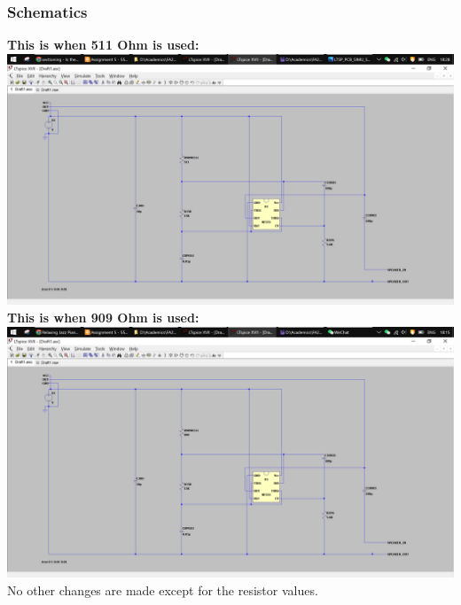 \documentclass{article}
\begin{document}
	\subsubsection{Schematics}
	\textbf{This is when 511 Ohm is used: }\newline
	\includegraphics[width=\columnwidth]{LTSP_PCB_SCHE_511}
	\textbf{This is when 909 Ohm is used: }\newline
	\includegraphics[width=\columnwidth]{LTSP_PCB_SCHE}
	No other changes are made except for the resistor values.
\end{document}
